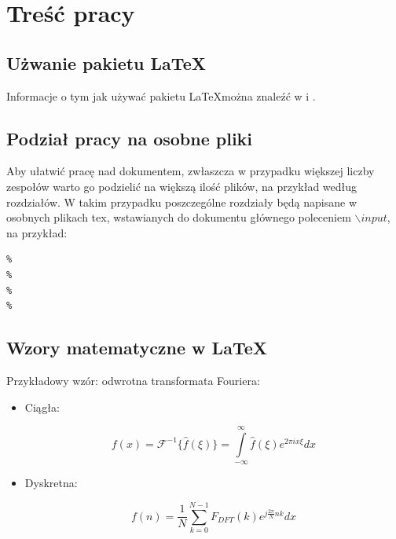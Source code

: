 \chapter{Treść pracy}
\label{sec:tresc}

\section{Użwanie pakietu \LaTeX}
\label{sec:tresc:latex}

	Informacje o tym jak używać pakietu \LaTeX można znaleźć w \cite{wiki:latex} i \cite{latex1}.\\

\section{Podział pracy na osobne pliki}
\label{sec:tresc:podzial}

Aby ułatwić pracę nad dokumentem, zwłaszcza w przypadku większej liczby zespołów warto go podzielić na większą ilość plików, na przykład według rozdziałów. W takim przypadku poszczególne rozdziały będą napisane w osobnych plikach tex, wstawianych do dokumentu głównego poleceniem $\backslash input$, na przykład:

\begin{lstlisting}
%
%
%
%
\end{lstlisting}

\section{Wzory matematyczne w \LaTeX}
\label{sec:tresc:wzory}

Przykładowy wzór: odwrotna transformata Fouriera:

\begin{itemize}
\item Ciągła:

\begin{equation}
 f(x) = \mathcal{F}^{-1}\{\hat{f}(\xi)\} = \int\limits_{-\infty}^{\infty}\hat{f}(\xi)e^{2\pi ix\xi}dx
 \label{eq:f2}
\end{equation}

\item Dyskretna:

\begin{equation}
 f(n) = \frac{1}{N}\sum\limits_{k = 0}^{N-1}F_{DFT}(k)e^{j \frac{2\pi}{N}nk}dx
 \label{eq:f4}
\end{equation}

\end{itemize}

